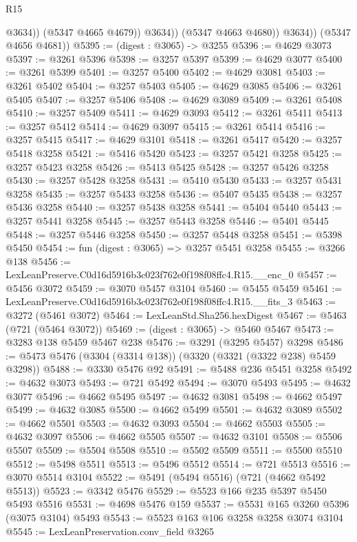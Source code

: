 \begin{lexlean}{R15}
\begin{coremodule}
                      @3634))
                  (@5347 @4665 @4679))
                @3634))
            (@5347 @4663 @4680))
          @3634))
      (@5347 @4656 @4681))
@5395 := (digest : @3065) -> @3255
@5396 := @4629 @3073
@5397 := @3261 @5396
@5398 := @3257 @5397
@5399 := @4629 @3077
@5400 := @3261 @5399
@5401 := @3257 @5400
@5402 := @4629 @3081
@5403 := @3261 @5402
@5404 := @3257 @5403
@5405 := @4629 @3085
@5406 := @3261 @5405
@5407 := @3257 @5406
@5408 := @4629 @3089
@5409 := @3261 @5408
@5410 := @3257 @5409
@5411 := @4629 @3093
@5412 := @3261 @5411
@5413 := @3257 @5412
@5414 := @4629 @3097
@5415 := @3261 @5414
@5416 := @3257 @5415
@5417 := @4629 @3101
@5418 := @3261 @5417
@5420 := @3257 @5418 @3258
@5421 := @5416 @5420
@5423 := @3257 @5421 @3258
@5425 := @3257 @5423 @3258
@5426 := @5413 @5425
@5428 := @3257 @5426 @3258
@5430 := @3257 @5428 @3258
@5431 := @5410 @5430
@5433 := @3257 @5431 @3258
@5435 := @3257 @5433 @3258
@5436 := @5407 @5435
@5438 := @3257 @5436 @3258
@5440 := @3257 @5438 @3258
@5441 := @5404 @5440
@5443 := @3257 @5441 @3258
@5445 := @3257 @5443 @3258
@5446 := @5401 @5445
@5448 := @3257 @5446 @3258
@5450 := @3257 @5448 @3258
@5451 := @5398 @5450
@5454 := fun (digest : @3065) => @3257 @5451 @3258
@5455 := @3266 @138
@5456 := LexLeanPreserve.C0d16d5916b3c023f762e0f198f08ffc4.R15.__enc_0
@5457 := @5456 @3072
@5459 := @3070 @5457 @3104
@5460 := @5455 @5459
@5461 := LexLeanPreserve.C0d16d5916b3c023f762e0f198f08ffc4.R15.__fits_3
@5463 := @3272 (@5461 @3072)
@5464 := LexLeanStd.Sha256.hexDigest
@5467 := @5463 (@721 (@5464 @3072))
@5469 := (digest : @3065) -> @5460 @5467
@5473 := @3283 @138 @5459 @5467 @238
@5476 := @3291 (@3295 @5457) @3298
@5486 := @5473 @5476 (@3304 (@3314 @138)) (@3320 (@3321 (@3322 @238) @5459 @3298))
@5488 := @3330 @5476 @92
@5491 := @5488 @236 @5451 @3258
@5492 := @4632 @3073
@5493 := @721 @5492
@5494 := @3070 @5493
@5495 := @4632 @3077
@5496 := @4662 @5495
@5497 := @4632 @3081
@5498 := @4662 @5497
@5499 := @4632 @3085
@5500 := @4662 @5499
@5501 := @4632 @3089
@5502 := @4662 @5501
@5503 := @4632 @3093
@5504 := @4662 @5503
@5505 := @4632 @3097
@5506 := @4662 @5505
@5507 := @4632 @3101
@5508 := @5506 @5507
@5509 := @5504 @5508
@5510 := @5502 @5509
@5511 := @5500 @5510
@5512 := @5498 @5511
@5513 := @5496 @5512
@5514 := @721 @5513
@5516 := @3070 @5514 @3104
@5522 := @5491 (@5494 @5516) (@721 (@4662 @5492 @5513))
@5523 := @3342 @5476
@5529 := @5523 @166 @235 @5397 @5450 @5493 @5516
@5531 := @4698 @5476 @159
@5537 := @5531 @165 @3260 @5396 (@3075 @3104) @5493
@5543 := @5523 @163 @106 @3258 @3258 @3074 @3104
@5545 := LexLeanPreservation.conv_field @3265

\end{coremodule}
\end{lexlean}
